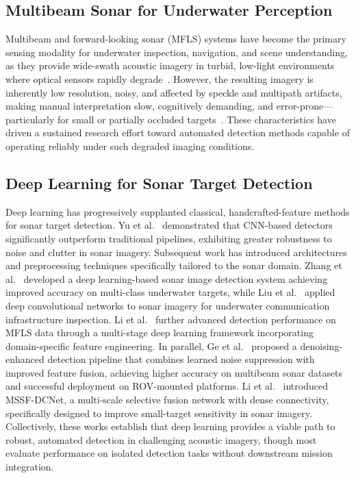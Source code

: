 \documentclass[conference]{IEEEtran}
\begin{document}
\subsection{Multibeam Sonar for Underwater Perception}

Multibeam and forward-looking sonar (MFLS) systems have become the primary sensing modality for underwater inspection, navigation, and scene understanding, as they provide wide-swath acoustic imagery in turbid, low-light environments where optical sensors rapidly degrade~\cite{ref2, ref6}. However, the resulting imagery is inherently low resolution, noisy, and affected by speckle and multipath artifacts, making manual interpretation slow, cognitively demanding, and error-prone---particularly for small or partially occluded targets~\cite{ref7}. These characteristics have driven a sustained research effort toward automated detection methods capable of operating reliably under such degraded imaging conditions.

\subsection{Deep Learning for Sonar Target Detection}

Deep learning has progressively supplanted classical, handcrafted-feature methods for sonar target detection. Yu et al.~\cite{ref7} demonstrated that CNN-based detectors significantly outperform traditional pipelines, exhibiting greater robustness to noise and clutter in sonar imagery. Subsequent work has introduced architectures and preprocessing techniques specifically tailored to the sonar domain. Zhang et al.~\cite{ref8} developed a deep learning-based sonar image detection system achieving improved accuracy on multi-class underwater targets, while Liu et al.~\cite{ref9} applied deep convolutional networks to sonar imagery for underwater communication infrastructure inspection. Li et al.~\cite{ref11} further advanced detection performance on MFLS data through a multi-stage deep learning framework incorporating domain-specific feature engineering. In parallel, Ge et al.~\cite{ref12} proposed a denoising-enhanced detection pipeline that combines learned noise suppression with improved feature fusion, achieving higher accuracy on multibeam sonar datasets and successful deployment on ROV-mounted platforms. Li et al.~\cite{ref13} introduced MSSF-DCNet, a multi-scale selective fusion network with dense connectivity, specifically designed to improve small-target sensitivity in sonar imagery. Collectively, these works establish that deep learning provides a viable path to robust, automated detection in challenging acoustic imagery, though most evaluate performance on isolated detection tasks without downstream mission integration.
\end{document}
